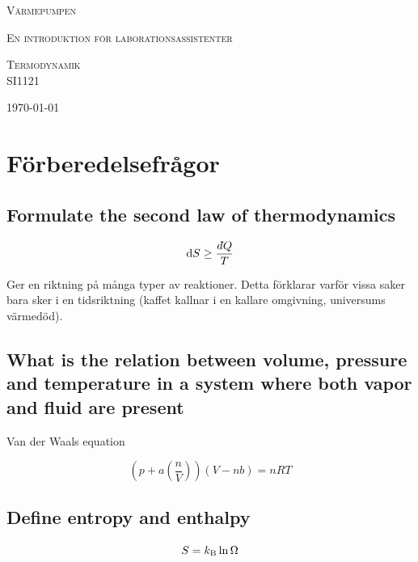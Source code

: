 \documentclass[11pt]{article}
\newcommand{\dbar}{d\hspace*{-0.08em}\bar{}\hspace*{0.1em}}
\begin{document}
\begin{titlepage}
	\centering
	{\scshape\LARGE Värmepumpen \par}
	{\scshape En introduktion för laborationsassistenter \par}
	\vspace{4cm}
	{\scshape\Large Termodynamik \\ SI1121\par}
	\vspace{2cm}
	\vfill
	{\large \today\par}
\end{titlepage}

\section{Förberedelsefrågor}

\subsection{Formulate the second law of thermodynamics}

\begin{equation}
    \mathrm{d}S \geq \frac{\dbar Q}{T}
\end{equation}

Ger en riktning på många typer av reaktioner. Detta förklarar varför vissa saker bara sker i en tidsriktning (kaffet kallnar i en kallare omgivning, universums värmedöd).

\subsection{What is the relation between volume, pressure and temperature in a system where both vapor and fluid are present}

Van der Waals equation

\begin{equation}
    \left ( p + a \left ( \frac{n}{V} \right ) \right ) (V - nb) = nRT
\end{equation}


\subsection{Define entropy and enthalpy}

\begin{equation}
    S = k_\text B \ln \Omega
\end{equation}
\end{document}
